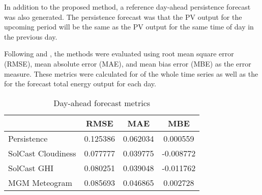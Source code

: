 In addition to the proposed method, a reference day-ahead persistence forecast was also generated.
The persistence forecast was that the PV output for the upcoming period will be the same as the PV output for the same time of day in the previous day.

Following \cite{Pedro2012} and \cite{Gigoni2018}, the methods were evaluated using root mean square error (RMSE), mean absolute error (MAE), and mean bias error (MBE) as the error measure.
These metrics were calculated for of the whole time series as well as the for the forecast total energy output for each day.

\begin{table}[!t]
	\centering
	\caption{Day-ahead forecast metrics}
	\label{table:dayahead-metrics}
	\begin{tabular}{lS[table-format=1.3]S[table-format=1.3]>{}S[table-format=-1.4]}
		\toprule
		                       &   {RMSE}   &   {MAE}    &    {MBE}    \\
        \midrule
		Persistence & 0.125386 & 0.062034 & 0.000559 \\
		SolCast Cloudiness & 0.077777 & 0.039775 & -0.008772 \\
		SolCast GHI & 0.080251 & 0.039048 & -0.011762 \\
		MGM Meteogram & 0.085693 & 0.046865 & 0.002728 \\
		\bottomrule
	\end{tabular}
\end{table}

